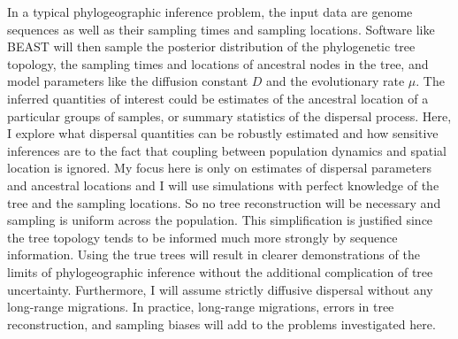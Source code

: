 \documentclass[aps,rmp, twocolumn]{revtex4}
\begin{document}
In a typical phylogeographic inference problem, the input data are genome sequences as well as their sampling times and sampling locations.
Software like BEAST will then sample the posterior distribution of the phylogenetic tree topology, the sampling times and locations of ancestral nodes in the tree, and model parameters like the diffusion constant $D$ and the evolutionary rate $\mu$.
The inferred quantities of interest could be estimates of the ancestral location of a particular groups of samples, or summary statistics of the dispersal process.
Here, I explore what dispersal quantities can be robustly estimated and how sensitive inferences are to the fact that coupling between population dynamics and spatial location is ignored.
My focus here is only on estimates of dispersal parameters and ancestral locations and I will use simulations with perfect knowledge of the tree and the sampling locations.
So no tree reconstruction will be necessary and sampling is uniform across the population.
This simplification is justified since the tree topology tends to be informed much more strongly by sequence information.
Using the true trees will result in clearer demonstrations of the limits of phylogeographic inference without the additional complication of tree uncertainty.
Furthermore, I will assume strictly diffusive dispersal without any long-range migrations.
In practice, long-range migrations, errors in tree reconstruction, and sampling biases will add to the problems investigated here.
\end{document}

